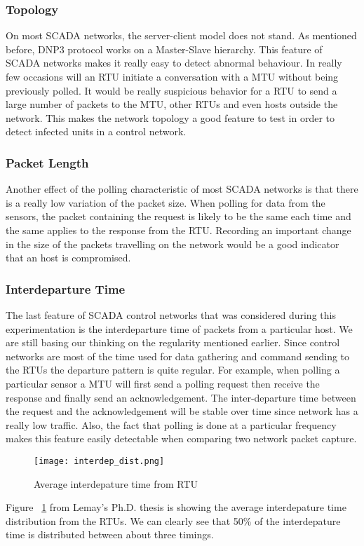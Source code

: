 \documentclass[12pt,journal,compsoc]{IEEEtran}
\begin{document}
\begin{empfile}
\subsubsection{Topology}
On most SCADA networks, the server-client model does not stand. As mentioned before, DNP3 protocol works on a Master-Slave hierarchy. This feature of SCADA networks makes it really easy to detect abnormal behaviour. In really few occasions will an RTU initiate a conversation with a MTU without being previously polled. It would be really suspicious behavior for a RTU to send a large number of packets to the MTU, other RTUs and even hosts outside the network. This makes the network topology a good feature to test in order to detect infected units in a control network.

\subsubsection{Packet Length}
Another effect of the polling characteristic of most SCADA networks is that there is a really low variation of the packet size. When polling for data from the sensors, the packet containing the request is likely to be the same each time and the same applies to the response from the RTU. Recording an important change in the size of the packets travelling on the network would be a good indicator that an host is compromised.


\subsubsection{Interdeparture Time}
The last feature of SCADA control networks that was considered during this experimentation is the interdeparture time of packets from a particular host. We are still basing our thinking on the regularity mentioned earlier. Since control networks are most of the time used for data gathering and command sending to the RTUs the departure pattern is quite regular. For example, when polling a particular sensor a MTU will first send a polling request then receive the response and finally send an acknowledgement. The inter-departure time between the request and the acknowledgement will be stable over time since network has a really low traffic. Also, the fact that polling is done at a particular frequency makes this feature easily detectable when comparing two network packet capture.
\begin{figure}[ht!]
\centering
\texttt{[image: interdep\_dist.png]}
\caption{Average interdepature time from RTU \cite{lemay}}
\label{fig:interdep}
\end{figure}
Figure ~\ref{fig:interdep} from Lemay's Ph.D. thesis is showing the average interdepature time distribution from the RTUs. We can clearly see that 50\% of the interdepature time is distributed between about three timings.


\end{empfile}
\end{document}
